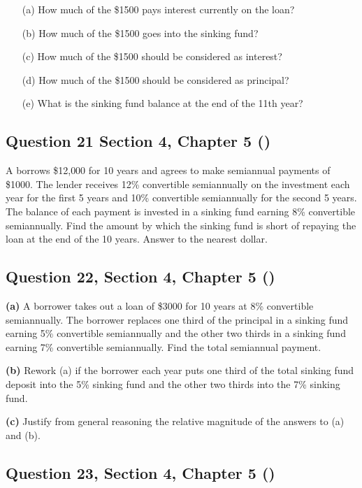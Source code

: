 \documentclass[12pt, a4paper]{article}
\begin{document}
\begin{enumerate}
\item[(a)] How much of the \$1500 pays interest currently on the loan?  
\item[(b)] How much of the \$1500 goes into the sinking fund?  
\item[(c)] How much of the \$1500 should be considered as interest?  
\item[(d)] How much of the \$1500 should be considered as principal?  
\item[(e)] What is the sinking fund balance at the end of the 11th year?  
\end{enumerate}

\subsection*{Question 21 Section 4, Chapter 5  (\cite{toi3rd})}

\noindent A borrows \$12{,}000 for 10 years and agrees to make semiannual payments of \$1000. The lender receives 12\% convertible semiannually on the investment each year for the first 5 years and 10\% convertible semiannually for the second 5 years. The balance of each payment is invested in a sinking fund earning 8\% convertible semiannually.  Find the amount by which the sinking fund is short of repaying the loan at the end of the 10 years. Answer to the nearest dollar.

\subsection*{Question 22, Section 4, Chapter 5  (\cite{toi3rd})}

\textbf{(a)} A borrower takes out a loan of \$3000 for 10 years at 8\% convertible semiannually.  
The borrower replaces one third of the principal in a sinking fund earning 5\% convertible semiannually and the other two thirds in a sinking fund earning 7\% convertible semiannually.  
Find the total semiannual payment.

\textbf{(b)} Rework (a) if the borrower each year puts one third of the total sinking fund deposit into the 5\% sinking fund and the other two thirds into the 7\% sinking fund.

\textbf{(c)} Justify from general reasoning the relative magnitude of the answers to (a) and (b).

\subsection*{Question 23, Section 4, Chapter 5  (\cite{toi3rd})}
\end{document}
